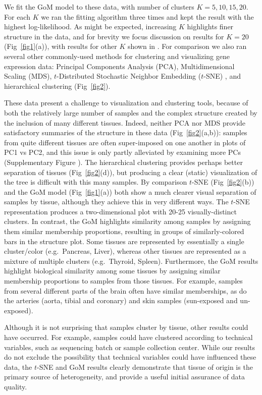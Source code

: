 \documentclass[10pt,letterpaper]{article}
\begin{document}
We fit the GoM model to these data, with number of clusters $K=5,10,15,20$. For each $K$ we ran the fitting algorithm three times and
kept the result with the highest log-likelihood. As might be expected, increasing $K$ highlights finer structure in the data, and for brevity we focus discussion
on results for $K=20$ (Fig~\ref{fig1}(a)), with results for other $K$ shown in .
For comparison we also ran several other commonly-used methods for clustering and visualizing gene expression data:
Principal Components Analysis (PCA), Multidimensional Scaling (MDS), $t$-Distributed Stochastic Neighbor Embedding
($t$-SNE) \cite{Maaten2008, Maaten2014}, and
hierarchical clustering (Fig~\ref{fig2}).

These data present a challenge to visualization and clustering tools, because of both the relatively large number of samples and
the complex structure created by the inclusion of many different tissues. Indeed, neither PCA nor MDS provide satisfactory summaries of the structure in these data (Fig~\ref{fig2}(a,b)): samples from quite different tissues are often super-imposed on one another in plots of PC1 vs PC2, and this issue is only partly alleviated by examining more PCs (Supplementary Figure ). The hierarchical clustering provides perhaps better separation of tissues (Fig~\ref{fig2}(d)), but producing a clear (static) visualization of the tree is difficult with this many samples. By comparison $t$-SNE (Fig~\ref{fig2}(b)) and the GoM model (Fig~\ref{fig1}(a)) both show a much clearer visual separation of samples by tissue, although they achieve this in very different ways.
The $t$-SNE representation produces a two-dimensional plot with 20-25 visually-distinct clusters. In contrast, the GoM
highlights similarity among samples by assigning them similar membership proportions, resulting in groups of similarly-colored bars in the structure plot.
Some tissues are represented by essentially a single cluster/color (e.g.~Pancreas, Liver),
whereas other tissues are represented as a mixture of multiple clusters (e.g.~Thyroid, Spleen).
Furthermore, the GoM results highlight biological similarity among some tissues by assigning similar membership proportions to samples from those tissues.  For example, samples from several different parts of the brain often have similar memberships, as do the arteries (aorta, tibial and coronary) and skin samples (sun-exposed and un-exposed).

Although it is not surprising that samples cluster by tissue, other results could have occurred. For example,
samples could have clustered according to technical variables, such as sequencing batch  \cite{Gilad2015} or sample collection center.
While our results do not exclude the possibility that technical variables could have influenced these data, the $t$-SNE and GoM results clearly demonstrate that tissue of origin is the primary source of heterogeneity,
and provide a useful initial assurance of data quality.
\end{document}
